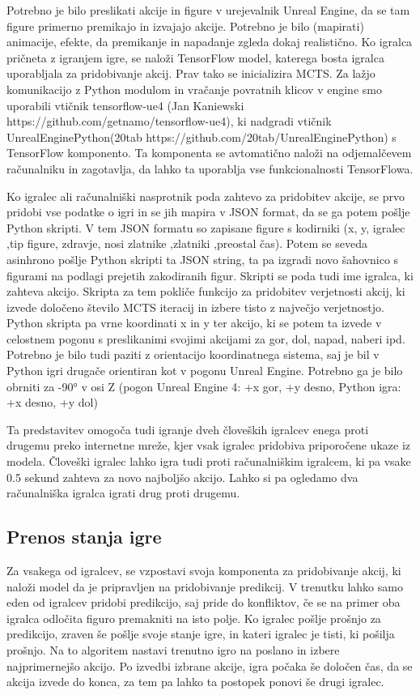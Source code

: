 \documentclass[a4paper, 12pt]{book}
\begin{document}
Potrebno je bilo preslikati akcije in figure v urejevalnik Unreal Engine, da se tam figure primerno premikajo in izvajajo akcije.
Potrebno je bilo (mapirati) animacije, efekte, da premikanje in napadanje zgleda dokaj realistično.
Ko igralca pričneta z igranjem igre, se naloži TensorFlow model, katerega bosta igralca uporabljala za pridobivanje akcij. Prav tako se inicializira MCTS.
Za lažjo komunikacijo z Python modulom in vračanje povratnih klicov v engine smo uporabili vtičnik tensorflow-ue4 (Jan Kaniewski https://github.com/getnamo/tensorflow-ue4), ki nadgradi vtičnik UnrealEnginePython(20tab https://github.com/20tab/UnrealEnginePython) s TensorFlow komponento. 
Ta komponenta se avtomatično naloži na odjemalčevem računalniku in zagotavlja, da lahko ta uporablja vse funkcionalnosti TensorFlowa.
 
Ko igralec ali računalniški nasprotnik poda zahtevo za pridobitev akcije, se prvo pridobi vse podatke o igri in se jih mapira v JSON format, da se ga potem pošlje Python skripti.
V tem JSON formatu so zapisane figure s kodirniki (x, y, igralec ,tip figure, zdravje, nosi zlatnike ,zlatniki ,preostal čas).
Potem se seveda asinhrono pošlje Python skripti ta JSON string, ta pa izgradi novo šahovnico s figurami na podlagi prejetih zakodiranih figur.
Skripti se poda tudi ime igralca, ki zahteva akcijo.
Skripta za tem pokliče funkcijo za pridobitev verjetnosti akcij, ki izvede določeno število MCTS iteracij in izbere tisto z največjo verjetnostjo.
Python skripta pa vrne koordinati x in y ter akcijo, ki se potem ta izvede v celostnem pogonu s preslikanimi svojimi akcijami za gor, dol, napad, naberi ipd.
Potrebno je bilo tudi paziti z orientacijo koordinatnega sistema, saj je bil v Python igri drugače orientiran kot v pogonu Unreal Engine. 
Potrebno ga je bilo obrniti za -90° v osi Z (pogon Unreal Engine 4: +x gor, +y desno, Python igra: +x desno, +y dol)

Ta predstavitev omogoča tudi igranje dveh človeških igralcev enega proti drugemu preko internetne mreže, kjer vsak igralec pridobiva priporočene ukaze iz modela.
Človeški igralec lahko igra tudi proti računalniškim igralcem, ki pa vsake 0.5 sekund zahteva za novo najboljšo akcijo.
Lahko si pa ogledamo dva računalniška igralca igrati drug proti drugemu.

\subsection{Prenos stanja igre}
Za vsakega od igralcev, se vzpostavi svoja komponenta za pridobivanje akcij, ki naloži model da je pripravljen na pridobivanje predikcij.
V trenutku lahko samo eden od igralcev pridobi predikcijo, saj pride do konfliktov, če se na primer oba igralca odločita figuro premakniti na isto polje.
Ko igralec pošlje prošnjo za predikcijo, zraven še pošlje svoje stanje igre, in kateri igralec je tisti, ki pošilja prošnjo.
Na to algoritem nastavi trenutno igro na poslano in izbere najprimernejšo akcijo.
Po izvedbi izbrane akcije, igra počaka še določen čas, da se akcija izvede do konca, za tem pa lahko ta postopek ponovi še drugi igralec.
\end{document}

